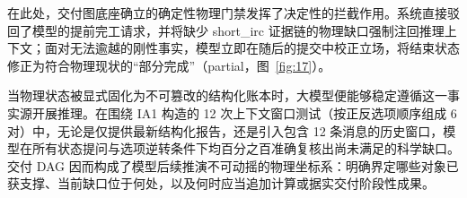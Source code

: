 在此处，交付图底座确立的确定性物理门禁发挥了决定性的拦截作用。系统直接驳回了模型的提前完工请求，并将缺少 short\_irc 证据链的物理缺口强制注回推理上下文；面对无法逾越的刚性事实，模型立即在随后的提交中校正立场，将结束状态修正为符合物理现状的“部分完成”（partial，图~\ref{fig:17}）。

当物理状态被显式固化为不可篡改的结构化账本时，大模型便能够稳定遵循这一事实源开展推理。在围绕 IA1 构造的 12 次上下文窗口测试（按正反选项顺序组成 6 对）中，无论是仅提供最新结构化报告，还是引入包含 12 条消息的历史窗口，模型在所有状态提问与选项逆转条件下均百分之百准确复核出尚未满足的科学缺口。交付 DAG 因而构成了模型后续推演不可动摇的物理坐标系：明确界定哪些对象已获支撑、当前缺口位于何处，以及何时应当追加计算或据实交付阶段性成果。


